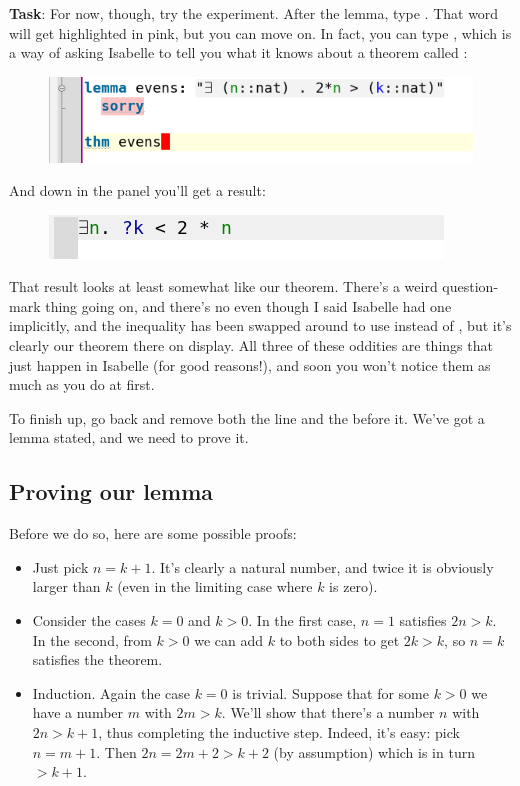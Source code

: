 \textbf{Task}: For now, though, try the experiment. After the lemma, type . That word will get highlighted in pink, but you can move on. In fact, you can type , which is a way of asking Isabelle to tell you what it knows about a theorem called : 
\begin{figure}[h]
    \includegraphics[width=0.75\linewidth]{TEXT/C01//Images/sorry-result.png}
\end{figure}

And down in the  panel you'll get a result:

\begin{figure}[H]
    \includegraphics[width=0.5\linewidth]{TEXT/C01//Images/result.png}
\end{figure}

That result looks at least somewhat like our theorem. There's a weird question-mark thing going on, and there's no  even though I said Isabelle had one implicitly, and the inequality has been swapped around to use \isi{<} instead of \isi{>}, but it's clearly our theorem there on display. All three of these oddities are things that just happen in Isabelle (for good reasons!), and soon you won't notice them as much as you do at first. 

To finish up, go back and remove both the  line and the  before it. We've got a lemma stated, and we need to prove it. 

\subsection{Proving our lemma}
Before we do so, here are some possible proofs:

\begin{itemize}
    \item Just pick $n = k + 1$. It's clearly a natural number, and twice it is obviously larger than $k$ (even in the limiting case where $k$ is zero). 
    \item Consider the cases $k = 0$ and $k > 0$. In the first case, $n = 1$ satisfies $2n > k$. In the second, from $k > 0$ we can add $k$ to both sides to get $2k > k$, so $n = k$ satisfies the theorem.
    \item Induction. Again the case $k = 0$ is trivial. Suppose that for some $k > 0$ we have a number $m$ with $2m > k$. We'll show that there's a number $n$ with $2n > k+1$, thus completing the inductive step. Indeed, it's easy: pick $n = m + 1$. Then $2n = 2m + 2  > k + 2$ (by assumption) which is in turn $> k + 1.$ 
\end{itemize}

